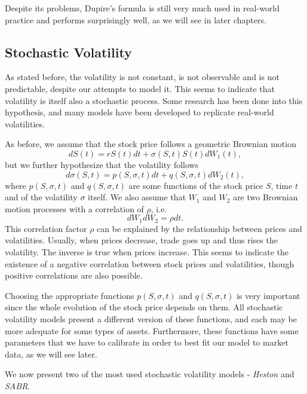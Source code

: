 Despite its problems, Dupire's formula is still very much used in real-world practice and performs surprisingly well, as we will see in later chapters.

\subsection{Stochastic Volatility}
\label{subsection:stochastic volatility}
As stated before, the volatility is not constant, is not observable and is not predictable, despite our attempts to model it. This seems to indicate that volatility is itself also a stochastic process. Some research has been done into this hypothesis, and many models have been developed to replicate real-world volatilities.

As before, we assume that the stock price follows a geometric Brownian motion
\begin{equation}\label{stochvol}
dS(t)=rS(t)dt+\sigma(S,t)S(t)dW_1(t),
\end{equation}
\noindent but we further hypothesize that the volatility follows
\begin{equation}
d\sigma(S,t)=p(S,\sigma,t)dt+q(S,\sigma,t)dW_2(t),
\end{equation}
\noindent where $p(S,\sigma,t)$ and $q(S,\sigma,t)$ are some functions of the stock price $S$, time $t$ and of the volatility $\sigma$ itself. We also assume that $W_1$ and $W_2$ are two Brownian motion processes with a correlation of $\rho$, i.e.
\begin{equation}
dW_1dW_2=\rho dt.
\end{equation}
\noindent This correlation factor $\rho$ can be explained by the relationship between prices and volatilities. Usually, when prices decrease, trade goes up and thus rises the volatility. The inverse is true when prices increase. This seems to indicate the existence of a negative correlation between stock prices and volatilities, though positive correlations are also possible.



Choosing the appropriate functions $p(S,\sigma,t)$ and $q(S,\sigma,t)$ is very important since the whole evolution of the stock price depends on them. All stochastic volatility models present a different version of these functions, and each may be more adequate for some types of assets. Furthermore, these functions have some parameters that we have to calibrate in order to best fit our model to market data, as we will see later.

We now present two of the most used stochastic volatility models - \emph{Heston} and \emph{SABR}.



